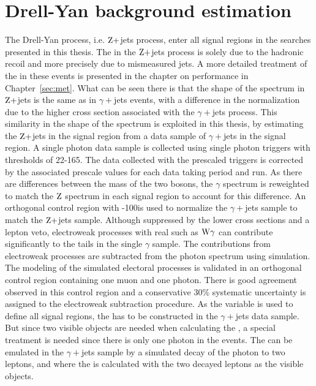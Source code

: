 \section{Drell-Yan background estimation}\label{sec:mettemplates}
\noindent\justify
The Drell-Yan process, i.e. $\mathrm{Z}+$jets process, enter all signal regions in the searches presented in this thesis. 
The \ptmiss in the $\mathrm{Z}+$jets process is solely due to the hadronic recoil and more precisely due to mismeasured jets. 
A more detailed treatment of the \ptmiss in these events is presented in the chapter on \ptmiss performance in Chapter~\ref{sec:met}. 
What can be seen there is that the shape of the \ptmiss spectrum in $\mathrm{Z}+$jets is the same as in $\gamma+$jets events, with a difference in the normalization due to the higher cross section associated with the $\gamma+$jets process. 
This similarity in the shape of the \ptmiss spectrum is exploited in this thesis, by estimating the $\mathrm{Z}+$jets in the signal region from a data sample of $\gamma+$jets in the signal region. 
\newpara
\noindent\justify
A single photon data sample is collected using single photon triggers with \pt thresholds of 22-165\GeV. 
The data collected with the prescaled triggers is corrected by the associated prescale values for each data taking period and run. 
As there are differences between the mass of the two bosons, the $\gamma$ \pt spectrum is reweighted to match the $\mathrm{Z}$ spectrum in each signal region to account for this difference. 
An orthogonal control region with -100\GeV is used to normalize the $\gamma+$jets sample to match the $\mathrm{Z}+$jets sample.
Although suppressed by the lower cross sections and a lepton veto, electroweak processes with real \ptmiss such as $\mathrm{W}\gamma$ can contribute significantly to the \ptmiss tails in the single $\gamma$ sample.
The contributions from electroweak processes are subtracted from the photon \ptmiss spectrum using simulation. 
The modeling of the simulated electoral processes is validated in an orthogonal control region containing one muon and one photon. 
There is good agreement observed in this control region and a conservative 30\% systematic uncertainty is assigned to the electroweak subtraction procedure.   
\newpara
\noindent\justify
As the \mttwo variable is used to define all signal regions, the \mttwo has to be constructed in the $\gamma+$jets data sample. 
But since two visible objects are needed when calculating the \mttwo, a special treatment is needed since there is only one photon in the events. 
The \mttwol can be emulated in the $\gamma+$jets sample by a simulated decay of the photon to two leptons, and where the \mttwol is calculated with the two decayed leptons as the visible objects.
